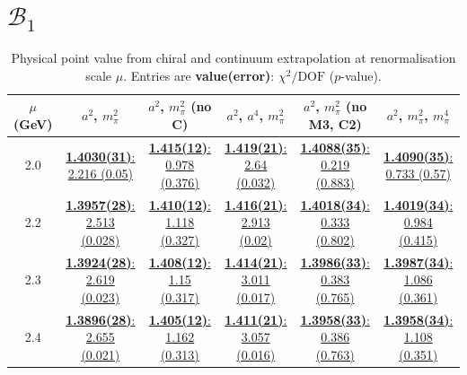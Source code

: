 \documentclass[12pt]{extarticle}
\begin{document}
\section{$\mathcal{B}_1$}
\begin{table}[h!]
\begin{center}
\begin{tabular}{|c|c|c|c|c|c|}
\hline
$\mu$ (GeV) & $a^2$, $m_\pi^2$& $a^2$, $m_\pi^2$ (no C)& $a^2$, $a^4$, $m_\pi^2$& $a^2$, $m_\pi^2$ (no M3, C2)& $a^2$, $m_\pi^2$, $m_\pi^4$\\
\hline
2.0& \hyperlink{VVpAA/NPR/a2m2_20.pdf.1}{\textbf{1.4030(31)}: 2.216 (0.05)} & \hyperlink{VVpAA/NPR/a2m2noC_20.pdf.1}{\textbf{1.415(12)}: 0.978 (0.376)} & \hyperlink{VVpAA/NPR/a2a4m2_20.pdf.1}{\textbf{1.419(21)}: 2.64 (0.032)} & \hyperlink{VVpAA/NPR/a2m2mcut_20.pdf.1}{\textbf{1.4088(35)}: 0.219 (0.883)} & \hyperlink{VVpAA/NPR/a2m2m4_20.pdf.1}{\textbf{1.4090(35)}: 0.733 (0.57)}\\
2.2& \hyperlink{VVpAA/NPR/a2m2_22.pdf.1}{\textbf{1.3957(28)}: 2.513 (0.028)} & \hyperlink{VVpAA/NPR/a2m2noC_22.pdf.1}{\textbf{1.410(12)}: 1.118 (0.327)} & \hyperlink{VVpAA/NPR/a2a4m2_22.pdf.1}{\textbf{1.416(21)}: 2.913 (0.02)} & \hyperlink{VVpAA/NPR/a2m2mcut_22.pdf.1}{\textbf{1.4018(34)}: 0.333 (0.802)} & \hyperlink{VVpAA/NPR/a2m2m4_22.pdf.1}{\textbf{1.4019(34)}: 0.984 (0.415)}\\
2.3& \hyperlink{VVpAA/NPR/a2m2_23.pdf.1}{\textbf{1.3924(28)}: 2.619 (0.023)} & \hyperlink{VVpAA/NPR/a2m2noC_23.pdf.1}{\textbf{1.408(12)}: 1.15 (0.317)} & \hyperlink{VVpAA/NPR/a2a4m2_23.pdf.1}{\textbf{1.414(21)}: 3.011 (0.017)} & \hyperlink{VVpAA/NPR/a2m2mcut_23.pdf.1}{\textbf{1.3986(33)}: 0.383 (0.765)} & \hyperlink{VVpAA/NPR/a2m2m4_23.pdf.1}{\textbf{1.3987(34)}: 1.086 (0.361)}\\
2.4& \hyperlink{VVpAA/NPR/a2m2_24.pdf.1}{\textbf{1.3896(28)}: 2.655 (0.021)} & \hyperlink{VVpAA/NPR/a2m2noC_24.pdf.1}{\textbf{1.405(12)}: 1.162 (0.313)} & \hyperlink{VVpAA/NPR/a2a4m2_24.pdf.1}{\textbf{1.411(21)}: 3.057 (0.016)} & \hyperlink{VVpAA/NPR/a2m2mcut_24.pdf.1}{\textbf{1.3958(33)}: 0.386 (0.763)} & \hyperlink{VVpAA/NPR/a2m2m4_24.pdf.1}{\textbf{1.3958(34)}: 1.108 (0.351)}\\
\hline
\end{tabular}
\caption{Physical point value from chiral and continuum extrapolation at renormalisation scale $\mu$. Entries are \textbf{value(error)}: $\chi^2/\text{DOF}$ ($p$-value).}
\end{center}
\end{table}
\end{document}
